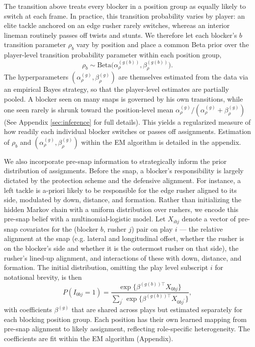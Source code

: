 \documentclass[USenglish]{article}
\theoremstyle{dgthm}
\theoremstyle{dgdef}
\begin{document}
The transition above treats every blocker in a position group as equally likely to switch at each frame. In practice, this transition probability varies by player: an elite tackle anchored on an edge rusher rarely switches, whereas an interior lineman routinely passes off twists and stunts. We therefore let each blocker's $b$ transition parameter $\rho_{b}$ vary by position and place a common Beta prior over the player-level transition probability parameter within each position group,
$$ \rho_{b} \sim \text{Beta}\big(\alpha^{(g(b))}_\rho, \beta^{(g(b))}_\rho\big). $$
%
The hyperparameters $(\alpha^{(g)}_\rho, \beta^{(g)}_\rho)$ are themselves estimated from the data via an empirical Bayes strategy, so that the player-level estimates are partially pooled. A blocker seen on many snaps is governed by his own transitions, while one seen rarely is shrunk toward the position-level mean $\alpha^{(g)}_\rho/(\alpha^{(g)}_\rho+\beta^{(g)}_\rho)$ (See Appendix \ref{sec:inference} for full details). This yields a regularized  measure of how readily each individual blocker switches or passes off assignments. Estimation of $\rho_{b}$ and $(\alpha^{(g)}_\rho,\beta^{(g)}_\rho)$ within the EM algorithm is detailed in the appendix.

We also incorporate pre-snap information to strategically inform the prior distribution of assignments. Before the snap, a blocker's responsibility is largely dictated by the protection scheme and the defensive alignment. For instance, a left tackle is a-priori likely to be responsible for the edge rusher aligned to its side, modulated by down, distance, and formation. Rather than initializing the hidden Markov chain with a uniform distribution over rushers, we encode this pre-snap belief with a multinomial-logistic model. Let $X_{ibj}$ denote a vector of pre-snap covariates for the (blocker $b$, rusher $j$) pair on play $i$ --- the relative alignment at the snap (e.g. lateral and longitudinal offset, whether the rusher is on the blocker's side and whether it is the outermost rusher on that side), the rusher's lined-up alignment, and interactions of these with down, distance, and formation. The initial distribution, omitting the play level subscript $i$ for notational brevity, is then
$$ P(I_{0 b j} = 1) = \frac{\exp\{\beta^{(g(b))\top} X_{0 b j}\}}{\sum_{j^{'}} \exp\{\beta^{(g(b))\top} X_{0b j^{'}}\}}, $$
with coefficients $\beta^{(g)}$ that are shared across plays but estimated separately for each blocking position group. Each position has their own learned mapping from pre-snap alignment to likely assignment, reflecting role-specific heterogeneity. The coefficients are fit within the EM algorithm (Appendix). 
\end{document}
